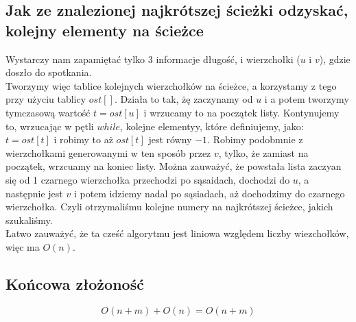 \documentclass{article}
\begin{document}
\subsection{Jak ze znalezionej najkrótszej ścieżki odzyskać, kolejny elementy na ścieżce}
Wystarczy nam zapamiętać tylko 3 informacje długość, i wierzchołki ($u$ i $v$), gdzie doszło do spotkania.\\
Tworzymy więc tablice kolejnych wierzchołków na ścieżce, a korzystamy z tego przy użyciu tablicy $ost[]$. Działa to tak, żę zaczynamy od $u$ i a potem tworzymy tymczasową wartość $t = ost[u]$ i wrzucamy to na początek listy. Kontynujemy to, wrzucając w pętli $while$, kolejne elementyy, które definiujemy, jako: $t = ost[t]$ i robimy to aż $ost[t]$ jest równy $-1$. Robimy podobmnie z wierzchołkami generowanymi w ten sposób przez $v$, tylko, że zamiast na początek, wrzcuamy na koniec listy. Można zauważyć, że powstała lista zaczyan się od 1 czarnego wierzchołka przechodzi po sąsaidach, dochodzi do $u$, a następnie jest $v$ i potem idziemy nadal po sąsiadach, aż dochodzimy do czarnego wierzchołka. Czyli otrzymaliśmu kolejne numery na najkrótszej ścieżce, jakich szukaliśmy. \\
Łatwo zauważyć, że ta cześć algorytmu jest liniowa względem liczby wiezchołków, więc ma $O(n)$.
\subsection{Końcowa złożoność}
\[
    O(n+m) + O(n) = O(n+m)
\]
\end{document}
